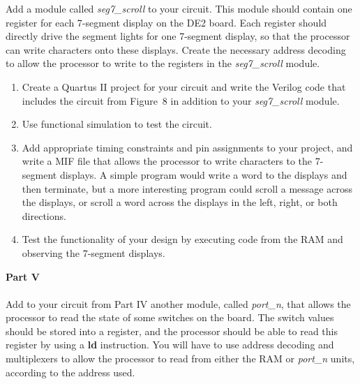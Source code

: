 \documentclass[epsfig,10pt,fullpage]{article}
\begin{document}
Add a module called {\it seg7\_scroll} to your circuit. This module should contain one
register for each 7-segment display on the DE2 board. Each register should directly drive
the segment lights for one 7-segment display, so that the processor can write characters
onto these displays. Create the necessary address decoding to allow the processor to
write to the registers in the {\it seg7\_scroll} module.

\begin{enumerate}
\item Create a Quartus II project for your circuit and write the Verilog code that
includes the circuit from Figure~8 in addition to your {\it seg7\_scroll} module.
\item Use functional simulation to test the circuit.
\item Add appropriate timing constraints and pin assignments to 
your project, and write a MIF file that allows the processor to write characters to the 
7-segment displays. A simple program would write a word to the displays and then
terminate, but a more interesting program could scroll a message across the displays, or 
scroll a word across the displays in the left, right, or both directions.
\item Test the functionality of your design by executing code from the RAM
and observing the 7-segment displays.
\end{enumerate}

\noindent
{\bf Part V}
~\\
~\\
\noindent
Add to your circuit from Part IV another module, called {\it port\_n}, that allows the 
processor to read the state of some switches on the board. The switch values should be 
stored into a register, and the processor should be able to read this register by 
using a {\bf ld} instruction. You will have to
use address decoding and multiplexers to allow the processor to read from either the RAM
or {\it port\_n} units, according to the address used.
\end{document}
